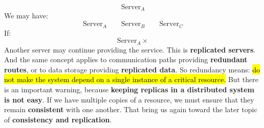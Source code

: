\begin{equation*}
    \boxed{\text{Server}_A}
\end{equation*}
We may have:
\begin{equation*}
    \boxed{\text{Server}_A}
    \qquad
    \boxed{\text{Server}_B}
    \qquad
    \boxed{\text{Server}_C}
\end{equation*}
If:
\begin{equation*}
    \text{Server}_A\times
\end{equation*}
Another server may continue providing the service. This is \textbf{replicated servers}. And the same concept applies to communication paths providing \textbf{redundant routes}, or to data storage providing \textbf{replicated data}. So redundancy means: \hl{do not make the system depend on a single instance of a critical resource.} But there is an important warning, because \textbf{keeping replicas in a distributed system is not easy}. If we have multiple copies of a resource, we must ensure that they remain \textbf{consistent} with one another. That bring us again toward the later topic of \textbf{consistency and replication}.

